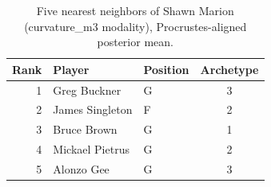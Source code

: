 \begin{table}[htbp]
  \centering\small
  \begin{tabular}{rllc}
    \toprule
    Rank & Player & Position & Archetype \\
    \midrule
    1 & Greg Buckner & G & 3 \\
    2 & James Singleton & F & 2 \\
    3 & Bruce Brown & G & 1 \\
    4 & Mickael Pietrus & G & 2 \\
    5 & Alonzo Gee & G & 3 \\
    \bottomrule
  \end{tabular}
  \caption{Five nearest neighbors of Shawn Marion (curvature_m3 modality), Procrustes-aligned posterior mean.}
  \label{tab:Shawn_Marion_neighbors_curvature_m3}
\end{table}

